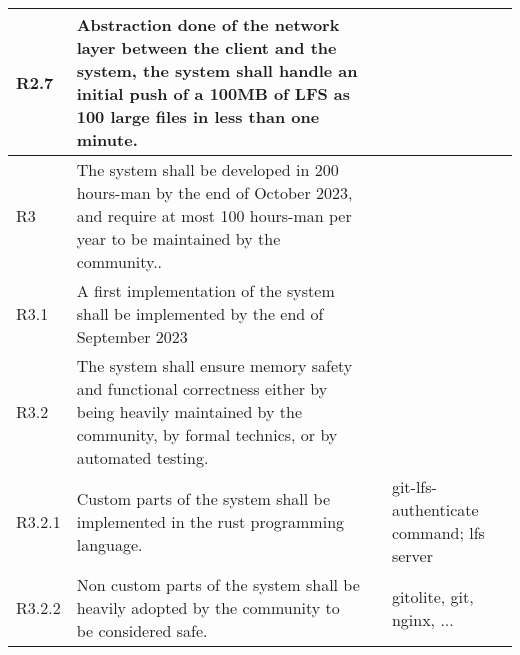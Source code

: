 \begin{landscape}
\begin{longtable}{|p{1cm}|p{19cm}|p{2cm}|p{3cm}|}
        \rowcolor[HTML]{DDDDDD}        R2.7 & Abstraction done of the network layer between the client and the system, the system shall handle an initial push of a 100MB of LFS as 100 large files in less than one minute.                                                                                                        &                       &                                          \\ \hline
        \rowcolor[HTML]{C0C0C0}        R3   & The system shall be developed in 200 hours-man by the end of October 2023, and require at most 100 hours-man per year to be maintained by the community..                                                                                                                             &                       &                                          \\ \hline
        \rowcolor[HTML]{DDDDDD}        R3.1 & A first implementation of the system shall be implemented by the end of September 2023                                                                                                                                                                                                &                       &                                          \\ \hline
        \rowcolor[HTML]{DDDDDD}        R3.2 & The system shall ensure memory safety and functional correctness either by being heavily maintained by the community, by formal technics, or by automated testing.                                                                                                                    &                       &                                          \\ \hline
        R3.2.1                              & Custom parts of the system shall be implemented in the rust programming language.                                                                                                                                                                                                     &                       & git-lfs-authenticate command; lfs server \\\hline
        R3.2.2                              & Non custom parts of the system shall be heavily adopted by the community to be considered safe.                                                                                                                                                                                       &                       & gitolite, git, nginx, ...                \\\hline

\end{longtable}
\end{landscape}
